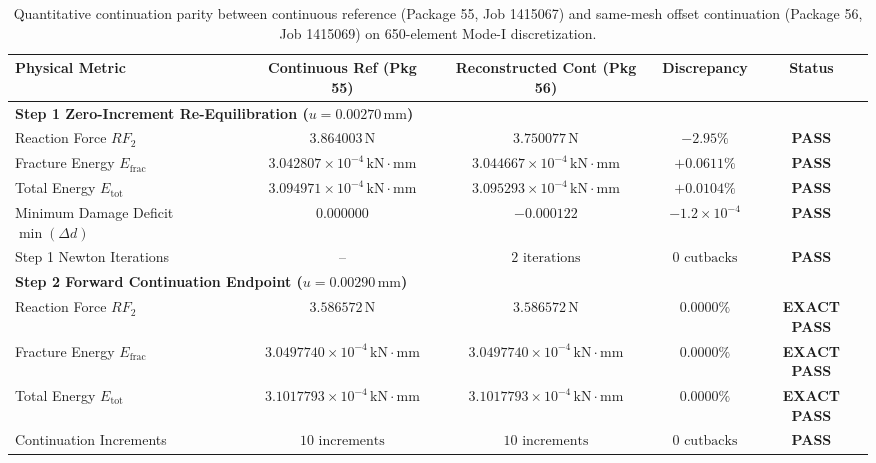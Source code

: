 \begin{table}[htbp]
\centering
\caption{Quantitative continuation parity between continuous reference (Package 55, Job 1415067) and same-mesh offset continuation (Package 56, Job 1415069) on 650-element Mode-I discretization.}
\label{tab:package55_vs_56_parity}
\small
\begin{tabular}{lcccc}
\hline
\textbf{Physical Metric} & \textbf{Continuous Ref (Pkg 55)} & \textbf{Reconstructed Cont (Pkg 56)} & \textbf{Discrepancy} & \textbf{Status} \\
\hline
\multicolumn{5}{l}{\textbf{Step 1 Zero-Increment Re-Equilibration ($u = 0.00270\,\mathrm{mm}$)}} \\
\hline
Reaction Force $RF_2$ & $3.864003\,\mathrm{N}$ & $3.750077\,\mathrm{N}$ & $-2.95\%$ & \textbf{PASS} \\
Fracture Energy $E_{\mathrm{frac}}$ & $3.042807 \times 10^{-4}\,\mathrm{kN\cdot mm}$ & $3.044667 \times 10^{-4}\,\mathrm{kN\cdot mm}$ & $+0.0611\%$ & \textbf{PASS} \\
Total Energy $E_{\mathrm{tot}}$ & $3.094971 \times 10^{-4}\,\mathrm{kN\cdot mm}$ & $3.095293 \times 10^{-4}\,\mathrm{kN\cdot mm}$ & $+0.0104\%$ & \textbf{PASS} \\
Minimum Damage Deficit $\min(\Delta d)$ & $0.000000$ & $-0.000122$ & $-1.2 \times 10^{-4}$ & \textbf{PASS} \\
Step 1 Newton Iterations & -- & $2\text{ iterations}$ & $0\text{ cutbacks}$ & \textbf{PASS} \\
\hline
\multicolumn{5}{l}{\textbf{Step 2 Forward Continuation Endpoint ($u = 0.00290\,\mathrm{mm}$)}} \\
\hline
Reaction Force $RF_2$ & $3.586572\,\mathrm{N}$ & $3.586572\,\mathrm{N}$ & $\mathbf{0.0000\%}$ & \textbf{EXACT PASS} \\
Fracture Energy $E_{\mathrm{frac}}$ & $3.0497740 \times 10^{-4}\,\mathrm{kN\cdot mm}$ & $3.0497740 \times 10^{-4}\,\mathrm{kN\cdot mm}$ & $\mathbf{0.0000\%}$ & \textbf{EXACT PASS} \\
Total Energy $E_{\mathrm{tot}}$ & $3.1017793 \times 10^{-4}\,\mathrm{kN\cdot mm}$ & $3.1017793 \times 10^{-4}\,\mathrm{kN\cdot mm}$ & $\mathbf{0.0000\%}$ & \textbf{EXACT PASS} \\
Continuation Increments & $10\text{ increments}$ & $10\text{ increments}$ & $0\text{ cutbacks}$ & \textbf{PASS} \\
\hline
\end{tabular}
\end{table}

